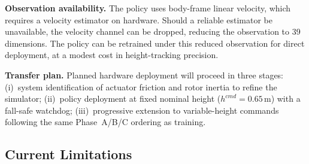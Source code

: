 \documentclass[conference]{IEEEtran}
\begin{document}
\noindent\textbf{Observation availability.}
The policy uses body-frame linear velocity, which requires a velocity
estimator on hardware.
Should a reliable estimator be unavailable, the velocity channel can
be dropped, reducing the observation to 39 dimensions.
The policy can be retrained under this reduced observation for
direct deployment, at a modest cost in height-tracking precision.

\noindent\textbf{Transfer plan.}
Planned hardware deployment will proceed in three stages:
(i)~system identification of actuator friction and rotor inertia
to refine the simulator;
(ii)~policy deployment at fixed nominal height ($h^{cmd}=0.65$\,m)
with a fall-safe watchdog;
(iii)~progressive extension to variable-height commands
following the same Phase~A/B/C ordering as training.

\subsection{Current Limitations}
\end{document}
